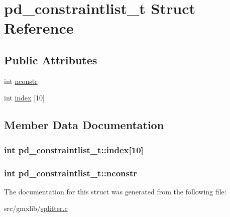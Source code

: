 \hypertarget{structpd__constraintlist__t}{\section{pd\-\_\-constraintlist\-\_\-t \-Struct \-Reference}
\label{structpd__constraintlist__t}
}
\subsection*{\-Public \-Attributes}
\begin{DoxyCompactItemize}
\item 
int \hyperlink{structpd__constraintlist__t_a4920937ec7fdd3d15f4bd3564176bed5}{nconstr}
\item 
int \hyperlink{structpd__constraintlist__t_a02144498906933e97578a7b1bf078fc6}{index} \mbox{[}10\mbox{]}
\end{DoxyCompactItemize}


\subsection{\-Member \-Data \-Documentation}
\hypertarget{structpd__constraintlist__t_a02144498906933e97578a7b1bf078fc6}{
\subsubsection[{index}]{\setlength{\rightskip}{0pt plus 5cm}int {\bf pd\-\_\-constraintlist\-\_\-t\-::index}\mbox{[}10\mbox{]}}}\label{structpd__constraintlist__t_a02144498906933e97578a7b1bf078fc6}
\hypertarget{structpd__constraintlist__t_a4920937ec7fdd3d15f4bd3564176bed5}{
\subsubsection[{nconstr}]{\setlength{\rightskip}{0pt plus 5cm}int {\bf pd\-\_\-constraintlist\-\_\-t\-::nconstr}}}\label{structpd__constraintlist__t_a4920937ec7fdd3d15f4bd3564176bed5}


\-The documentation for this struct was generated from the following file\-:\begin{DoxyCompactItemize}
\item 
src/gmxlib/\hyperlink{splitter_8c}{splitter.\-c}\end{DoxyCompactItemize}
